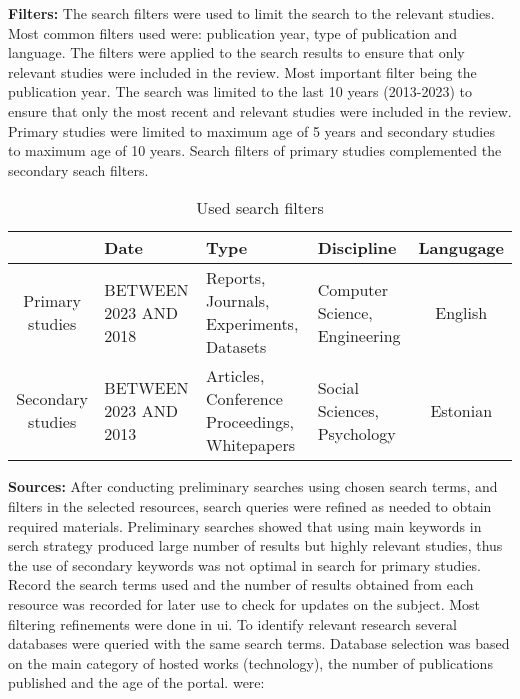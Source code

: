 \textbf{Filters:} The search filters were used to limit the search to the relevant studies. Most common filters used were: publication
year, type of publication and language. The filters were applied to the search results to ensure that only relevant studies were
included in the review. Most important filter being the publication year. The search was limited to the last 10 years (2013-2023) to
ensure that only the most recent and relevant studies were included in the review. Primary studies were limited to maximum age of 5
years and secondary studies to maximum age of 10 years. Search filters of primary studies complemented the secondary seach filters.

\begin{table}[h]
  \centering
  \caption{Used search filters}
  \label{tab:filters}
  \begin{tabularx}{\textwidth}{|c|Y|Y|Y|c|}
    \hline
    \textbf{}         & \textbf{Date}         & \textbf{Type}                                 & \textbf{Discipline}           & \textbf{Langugage} \\\hline
    Primary studies   & BETWEEN 2023 AND 2018 & Reports, Journals, Experiments, Datasets      & Computer Science, Engineering     & English            \\\hline
    Secondary studies & BETWEEN 2023 AND 2013 & Articles, Conference Proceedings, Whitepapers & Social Sciences, Psychology & Estonian \\\hline
  \end{tabularx}
\end{table}

\textbf{Sources:}
After conducting preliminary searches using chosen search terms, and filters in the selected resources, search
queries were refined as needed to obtain required materials. Preliminary searches showed that using main keywords in serch strategy
produced large
number
of
results but highly relevant studies, thus the use of secondary keywords was not optimal in search for primary studies. Record the search
terms used and the number
of results
obtained from each
resource was recorded for later use to check for updates on the subject. Most filtering refinements were done in \ac{ui}. To identify relevant research several databases were queried with the same search terms. Database selection was based
on the main category of hosted works (technology), the number of publications published and the age of the portal.
were:

